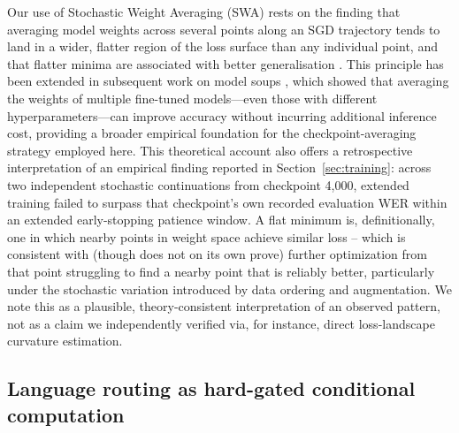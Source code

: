 \documentclass[11pt]{article}
\begin{document}
Our use of Stochastic Weight Averaging (SWA) rests on the finding that averaging model weights across several points along an SGD trajectory tends to land in a wider, flatter region of the loss surface than any individual point, and that flatter minima are associated with better generalisation \cite{izmailov2018swa}. This principle has been extended in subsequent work on model soups \cite{wortsman2022modelsoups}, which showed that averaging the weights of multiple fine-tuned models---even those with different hyperparameters---can improve accuracy without incurring additional inference cost, providing a broader empirical foundation for the checkpoint-averaging strategy employed here. This theoretical account also offers a retrospective interpretation of an empirical finding reported in Section~\ref{sec:training}: across two independent stochastic continuations from checkpoint 4{,}000, extended training failed to surpass that checkpoint's own recorded evaluation WER within an extended early-stopping patience window. A flat minimum is, definitionally, one in which nearby points in weight space achieve similar loss -- which is consistent with (though does not on its own prove) further optimization from that point struggling to find a nearby point that is reliably better, particularly under the stochastic variation introduced by data ordering and augmentation. We note this as a plausible, theory-consistent interpretation of an observed pattern, not as a claim we independently verified via, for instance, direct loss-landscape curvature estimation.

\subsection{Language routing as hard-gated conditional computation}
\end{document}
